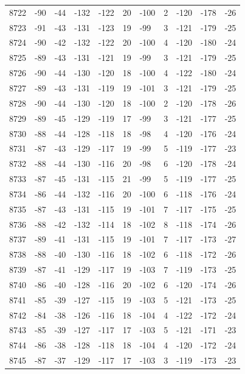 \begin{table}[H]
\begin{tabular}{lllllllllll}
8722 & -90 & -44 & -132 & -122 & 20 & -100 & 2 & -120 & -178 & -26 \\
8723 & -91 & -43 & -131 & -123 & 19 & -99 & 3 & -121 & -179 & -25 \\
8724 & -90 & -42 & -132 & -122 & 20 & -100 & 4 & -120 & -180 & -24 \\
8725 & -89 & -43 & -131 & -121 & 19 & -99 & 3 & -121 & -179 & -25 \\
8726 & -90 & -44 & -130 & -120 & 18 & -100 & 4 & -122 & -180 & -24 \\
8727 & -89 & -43 & -131 & -119 & 19 & -101 & 3 & -121 & -179 & -25 \\
8728 & -90 & -44 & -130 & -120 & 18 & -100 & 2 & -120 & -178 & -26 \\
8729 & -89 & -45 & -129 & -119 & 17 & -99 & 3 & -121 & -177 & -25 \\
8730 & -88 & -44 & -128 & -118 & 18 & -98 & 4 & -120 & -176 & -24 \\
8731 & -87 & -43 & -129 & -117 & 19 & -99 & 5 & -119 & -177 & -23 \\
8732 & -88 & -44 & -130 & -116 & 20 & -98 & 6 & -120 & -178 & -24 \\
8733 & -87 & -45 & -131 & -115 & 21 & -99 & 5 & -119 & -177 & -25 \\
8734 & -86 & -44 & -132 & -116 & 20 & -100 & 6 & -118 & -176 & -24 \\
8735 & -87 & -43 & -131 & -115 & 19 & -101 & 7 & -117 & -175 & -25 \\
8736 & -88 & -42 & -132 & -114 & 18 & -102 & 8 & -118 & -174 & -26 \\
8737 & -89 & -41 & -131 & -115 & 19 & -101 & 7 & -117 & -173 & -27 \\
8738 & -88 & -40 & -130 & -116 & 18 & -102 & 6 & -118 & -172 & -26 \\
8739 & -87 & -41 & -129 & -117 & 19 & -103 & 7 & -119 & -173 & -25 \\
8740 & -86 & -40 & -128 & -116 & 20 & -102 & 6 & -120 & -174 & -26 \\
8741 & -85 & -39 & -127 & -115 & 19 & -103 & 5 & -121 & -173 & -25 \\
8742 & -84 & -38 & -126 & -116 & 18 & -104 & 4 & -122 & -172 & -24 \\
8743 & -85 & -39 & -127 & -117 & 17 & -103 & 5 & -121 & -171 & -23 \\
8744 & -86 & -38 & -128 & -118 & 18 & -104 & 4 & -120 & -172 & -24 \\
8745 & -87 & -37 & -129 & -117 & 17 & -103 & 3 & -119 & -173 & -23 \\

\end{tabular}
\end{table}
